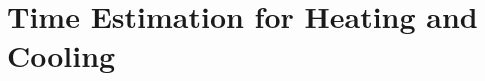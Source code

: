 \documentclass[../../main]{subfiles}
\begin{document}
\section{Time Estimation for Heating and Cooling} \label{sec:}
\end{document}
